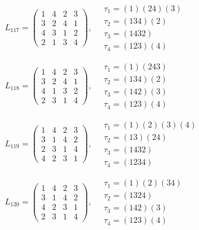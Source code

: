 $L_{117} = \begin{pmatrix} 1 & 4 & 2 & 3 \\ 3 & 2 & 4 & 1 \\ 4 & 3 & 1 & 2 \\ 2 & 1 & 3 & 4 \end{pmatrix}, \quad \begin{matrix} \tau_{1} = (1)(2 4)(3) \\ \tau_{2} = (1 3 4)(2) \\ \tau_{3} = (1 4 3 2) \\ \tau_{4} = (1 2 3)(4) \end{matrix}$

$L_{118} = \begin{pmatrix} 1 & 4 & 2 & 3 \\ 3 & 2 & 4 & 1 \\ 4 & 1 & 3 & 2 \\ 2 & 3 & 1 & 4 \end{pmatrix}, \quad \begin{matrix} \tau_{1} = (1)(2 4 3) \\ \tau_{2} = (1 3 4)(2) \\ \tau_{3} = (1 4 2)(3) \\ \tau_{4} = (1 2 3)(4) \end{matrix}$

$L_{119} = \begin{pmatrix} 1 & 4 & 2 & 3 \\ 3 & 1 & 4 & 2 \\ 2 & 3 & 1 & 4 \\ 4 & 2 & 3 & 1 \end{pmatrix}, \quad \begin{matrix} \tau_{1} = (1)(2)(3)(4) \\ \tau_{2} = (1 3)(2 4) \\ \tau_{3} = (1 4 3 2) \\ \tau_{4} = (1 2 3 4) \end{matrix}$

$L_{120} = \begin{pmatrix} 1 & 4 & 2 & 3 \\ 3 & 1 & 4 & 2 \\ 4 & 2 & 3 & 1 \\ 2 & 3 & 1 & 4 \end{pmatrix}, \quad \begin{matrix} \tau_{1} = (1)(2)(3 4) \\ \tau_{2} = (1 3 2 4) \\ \tau_{3} = (1 4 2)(3) \\ \tau_{4} = (1 2 3)(4) \end{matrix}$

